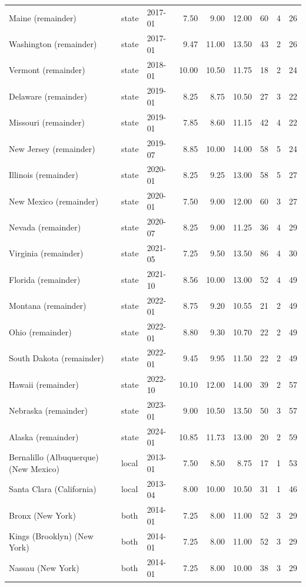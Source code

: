 \begin{tabular}{lllrrrrrr}
Maine (remainder) & state & 2017-01 & 7.50 & 9.00 & 12.00 & 60 & 4 & 26 \\
Washington (remainder) & state & 2017-01 & 9.47 & 11.00 & 13.50 & 43 & 2 & 26 \\
Vermont (remainder) & state & 2018-01 & 10.00 & 10.50 & 11.75 & 18 & 2 & 24 \\
Delaware (remainder) & state & 2019-01 & 8.25 & 8.75 & 10.50 & 27 & 3 & 22 \\
Missouri (remainder) & state & 2019-01 & 7.85 & 8.60 & 11.15 & 42 & 4 & 22 \\
New Jersey (remainder) & state & 2019-07 & 8.85 & 10.00 & 14.00 & 58 & 5 & 24 \\
Illinois (remainder) & state & 2020-01 & 8.25 & 9.25 & 13.00 & 58 & 5 & 27 \\
New Mexico (remainder) & state & 2020-01 & 7.50 & 9.00 & 12.00 & 60 & 3 & 27 \\
Nevada (remainder) & state & 2020-07 & 8.25 & 9.00 & 11.25 & 36 & 4 & 29 \\
Virginia (remainder) & state & 2021-05 & 7.25 & 9.50 & 13.50 & 86 & 4 & 30 \\
Florida (remainder) & state & 2021-10 & 8.56 & 10.00 & 13.00 & 52 & 4 & 49 \\
Montana (remainder) & state & 2022-01 & 8.75 & 9.20 & 10.55 & 21 & 2 & 49 \\
Ohio (remainder) & state & 2022-01 & 8.80 & 9.30 & 10.70 & 22 & 2 & 49 \\
South Dakota (remainder) & state & 2022-01 & 9.45 & 9.95 & 11.50 & 22 & 2 & 49 \\
Hawaii (remainder) & state & 2022-10 & 10.10 & 12.00 & 14.00 & 39 & 2 & 57 \\
Nebraska (remainder) & state & 2023-01 & 9.00 & 10.50 & 13.50 & 50 & 3 & 57 \\
Alaska (remainder) & state & 2024-01 & 10.85 & 11.73 & 13.00 & 20 & 2 & 59 \\
Bernalillo (Albuquerque) (New Mexico) & local & 2013-01 & 7.50 & 8.50 & 8.75 & 17 & 1 & 53 \\
Santa Clara (California) & local & 2013-04 & 8.00 & 10.00 & 10.50 & 31 & 1 & 46 \\
Bronx (New York) & both & 2014-01 & 7.25 & 8.00 & 11.00 & 52 & 3 & 29 \\
Kings (Brooklyn) (New York) & both & 2014-01 & 7.25 & 8.00 & 11.00 & 52 & 3 & 29 \\
Nassau (New York) & both & 2014-01 & 7.25 & 8.00 & 10.00 & 38 & 3 & 29 \\

\end{tabular}
